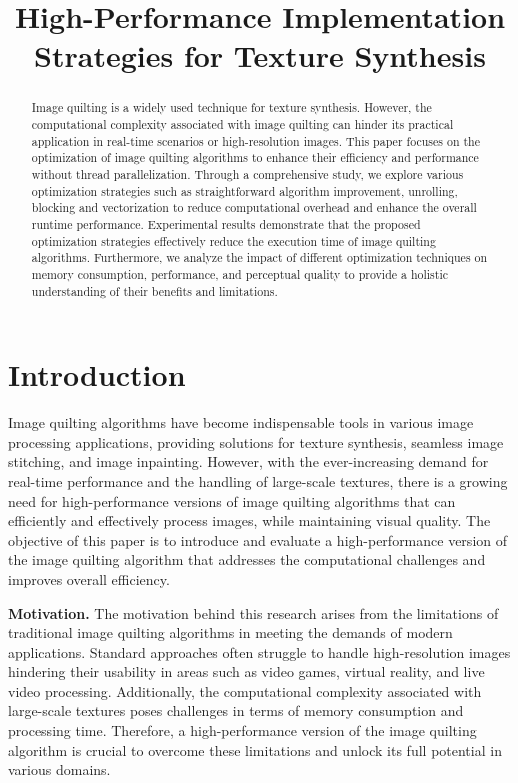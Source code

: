 \documentclass[letterpaper]{article}
\title{High-Performance Implementation Strategies for Texture Synthesis}
\newcommand{\mypar}[1]{{\bf #1.}}
\begin{document}
\pagestyle{plain}

%
\maketitle
%

\begin{abstract}
Image quilting is a widely used technique for texture synthesis. However, the computational complexity associated with image quilting can hinder its practical application in real-time scenarios or high-resolution images. This paper focuses on the optimization of image quilting algorithms to enhance their efficiency and performance without thread parallelization.
Through a comprehensive study, we explore various optimization strategies such as straightforward algorithm improvement, unrolling, blocking and vectorization to reduce computational overhead and enhance the overall runtime performance.
Experimental results demonstrate that the proposed optimization strategies effectively reduce the execution time of image quilting algorithms. Furthermore, we analyze the impact of different optimization techniques on memory consumption, performance, and perceptual quality to provide a holistic understanding of their benefits and limitations.
\end{abstract}

\section{Introduction}\label{sec:intro}

Image quilting algorithms have become indispensable tools in various image processing applications, providing solutions for texture synthesis, seamless image stitching, and image inpainting. However, with the ever-increasing demand for real-time performance and the handling of large-scale textures, there is a growing need for high-performance versions of image quilting algorithms that can efficiently and effectively process images, while maintaining visual quality. The objective of this paper is to introduce and evaluate a high-performance version of the image quilting algorithm that addresses the computational challenges and improves overall efficiency. 

\mypar{Motivation} The motivation behind this research arises from the limitations of traditional image quilting algorithms in meeting the demands of modern applications. Standard approaches often struggle to handle high-resolution images hindering their usability in areas such as video games, virtual reality, and live video processing. Additionally, the computational complexity associated with large-scale textures poses challenges in terms of memory consumption and processing time. Therefore, a high-performance version of the image quilting algorithm is crucial to overcome these limitations and unlock its full potential in various domains.
\end{document}
